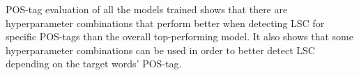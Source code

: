 POS-tag evaluation of all the models trained shows that there are hyperparameter combinations that perform better when detecting LSC for specific POS-tags than the overall top-performing model. It also shows that some hyperparameter combinations can be used in order to better detect LSC depending on the target words’ POS-tag. 
